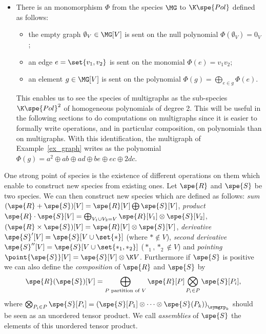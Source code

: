 \begin{exam}
\begin{itemize}
        \item There is an monomorphism $\Phi$ from the species $\MG$ to $\K\spe{Pol}$ defined as follows:
        \begin{itemize}\label{graphpol}
            \item the empty graph $\emptyset_V\in \MG[V]$ is sent on the null polynomial $\Phi(\emptyset_V) = 0_V$;
            \item an edge $e=\set{v_1,v_2}$ is sent on the monomial $\Phi(e) = v_1v_2$;
            \item an element $g\in \MG[V]$ is sent on the polynomial $\Phi(g) = \bigoplus_{e\in g} \Phi(e)$.
        \end{itemize}
        This enables us to see the species of multigraphs as the sub-species $\K\spe{Pol}^2$ of homogeneous 
        polynomials of degree 2. This will be useful in the following sections to do computations on multigraphs since 
        it is easier to formally write operations, and in particular composition, on polynomials than on multigraphs.
        With this identification, the multigraph of Example~\ref{ex_graph} writes as the polynomial 
        $\Phi(g) = a^2\oplus ab\oplus ad\oplus be\oplus ec\oplus 2dc$.
    \end{itemize}
\end{exam}

One strong point of species is the existence of  different operations on them which enable to construct
new species from existing ones. Let $\spe{R}$ and $\spe{S}$ be two species. We can then construct new 
species which are defined as follows: {\em sum} $(\spe{R}+\spe{S})[V] = \spe{R}[V]\bigoplus \spe{S}[V]$, 
{\em product} $\spe{R}\cdot \spe{S}[V] = \bigoplus_{V_1\cup V_2 = V} \spe{R}[V_1]\otimes \spe{S}[V_2]$,
 $(\spe{R}\times \spe{S})[V] = \spe{R}[V]\otimes \spe{S}[V]$, 
{\em derivative} $\spe{S}'[V] = \spe{S}[V\cup\set{\ast}]$ (where $\ast\not\in V$), 
{\em second derivative} $\spe{S}''[V] = \spe{S}[V\cup\set{\ast_1,\ast_2}]$ ($\ast_1,\ast_2\not\in V$) 
and {\em pointing} $\point{\spe{S}}[V] = \spe{S}[V]\otimes \K V$. Furthermore if $\spe{S}$ is positive we 
can also define the {\em composition} of $\spe{R}$ and $\spe{S}$ by
$$\spe{R}(\spe{S})[V] = \bigoplus_{\text{$P$ partition of $V$}}\spe{R}[P]\bigotimes_{P_i\in P} \spe{S}[P_i],$$
where $\bigotimes_{P_i\in P} \spe{S}[P_i]=\left(\spe{S}[P_1]\otimes\dots\otimes\spe{S}(P_k)\right)_{\symgrp_k}$ 
should be seen as an unordered tensor product. We call {\em assemblies} of $\spe{S}$ the elements of
this unordered tensor product.


